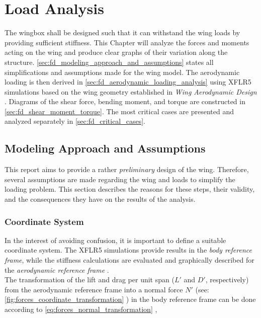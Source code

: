 \chapter{Load Analysis}
\label{ch:LoadAnalysis}
The wingbox shall be designed such that it can withstand the wing loads by providing sufficient stiffness. This Chapter will analyze the forces and moments acting on the wing and produce clear graphs of their variation along the structure. \autoref{sec:fd_modeling_approach_and_assumptions} states all simplifications and assumptions made for the wing model. The aerodynamic loading is then derived in \autoref{sec:fd_aerodynamic_loading_analysis} using XFLR5 simulations based on the wing geometry established in \textit{Wing Aerodynamic Design} \cite{Koppejan2024WingDesign}. Diagrams of the shear force, bending moment, and torque are constructed in \autoref{sec:fd_shear_moment_torque}. The most critical cases are presented and analyzed separately in \autoref{sec:fd_critical_cases}.

\section{Modeling Approach and Assumptions} \label{sec:fd_modeling_approach_and_assumptions}

This report aims to provide a rather \textit{preliminary} design of the wing. Therefore, several assumptions are made regarding the wing and loads to simplify the loading problem. This section describes the reasons for these steps, their validity, and the consequences they have on the results of the analysis.

\subsection*{Coordinate System}
In the interest of avoiding confusion, it is important to define a suitable coordinate system. The XFLR5 simulations provide results in the \textit{body reference frame}, while the stiffness calculations are evaluated and graphically described for the \textit{aerodynamic reference frame} \cite{Timmer2024AE2111-IReader}.\\

\noindent The transformation of the lift and drag per unit span ($L'$ and $D'$, respectively) from the aerodynamic reference frame into a normal force $N'$ (see: \autoref{fig:forces_coordinate_transformation} \cite{Timmer2024AE2111-IReader}) in the body reference frame can be done according to \autoref{eq:forces_normal_transformation} \cite{Timmer2024AE2111-IReader}, \\


